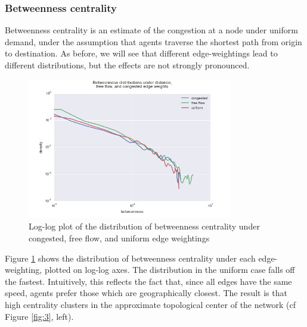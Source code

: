 \documentclass[english]{scrartcl}
\begin{document}
		\subsubsection{Betweenness centrality}
			Betweenness centrality is an estimate of the congestion at a node under uniform demand, under the assumption that agents traverse the shortest path from origin to destination. As before, we will see that different edge-weightings lead to different distributions, but the effects are not strongly pronounced. 
			\begin{figure}
				\centering
					\includegraphics[width = 0.8\textwidth]{betweenness_distributions.png}
				\caption{Log-log plot of the distribution of betweenness centrality under congested, free flow, and uniform edge weightings}
				\label{fig:2}
			\end{figure}
			Figure \ref{fig:2} shows the distribution of betweenness centrality under each edge-weighting, plotted on log-log axes. The distribution in the uniform case falls off the fastest. Intuitively, this reflects the fact that, since all edges have the same speed, agents prefer those which are geographically closest. The result is that high centrality clusters in the approximate topological center of the network (cf Figure \ref{fig:3}, left).
\end{document}
